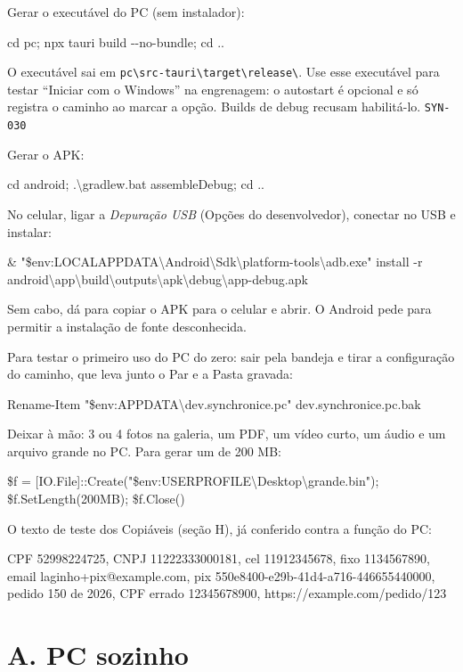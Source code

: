 \documentclass[11pt,a4paper]{article}
\newcommand{\letra}{P}
\newcommand{\secao}[2]{\renewcommand{\letra}{#1}\section*{#1. #2}\addcontentsline{toc}{section}{#1. #2}}
\newcommand{\fonte}[1]{\hfill{\small\color{fonte}\texttt{#1}}}
\newcommand{\cmd}[1]{\par\smallskip\colorbox{caixa}{\parbox{\dimexpr\linewidth-2\fboxsep}{\small\ttfamily #1}}\par\smallskip}
\begin{document}
\begin{passos}
  \item Gerar o executável do PC (sem instalador):
        \cmd{cd pc; npx tauri build -{}-no-bundle; cd ..}
        O executável sai em \texttt{pc\textbackslash src-tauri\textbackslash target\textbackslash release\textbackslash}.
        Use esse executável para testar ``Iniciar com o Windows'' na engrenagem:
        o autostart é opcional e só registra o caminho ao marcar a opção.
        Builds de debug recusam habilitá-lo. \fonte{SYN-030}
  \item Gerar o APK:
        \cmd{cd android; .\textbackslash gradlew.bat assembleDebug; cd ..}
  \item No celular, ligar a \emph{Depuração USB} (Opções do desenvolvedor),
        conectar no USB e instalar:
        \cmd{\& "\$env:LOCALAPPDATA\textbackslash Android\textbackslash Sdk\textbackslash platform-tools\textbackslash adb.exe" install -r android\textbackslash app\textbackslash build\textbackslash outputs\textbackslash apk\textbackslash debug\textbackslash app-debug.apk}
        Sem cabo, dá para copiar o APK para o celular e abrir. O Android pede
        para permitir a instalação de fonte desconhecida.
  \item Para testar o primeiro uso do PC do zero: sair pela bandeja e tirar a
        configuração do caminho, que leva junto o Par e a Pasta gravada:
        \cmd{Rename-Item "\$env:APPDATA\textbackslash dev.synchronice.pc" dev.synchronice.pc.bak}
  \item Deixar à mão: 3 ou 4 fotos na galeria, um PDF, um vídeo curto, um
        áudio e um arquivo grande no PC. Para gerar um de 200 MB:
        \cmd{\$f = [IO.File]::Create("\$env:USERPROFILE\textbackslash Desktop\textbackslash grande.bin"); \$f.SetLength(200MB); \$f.Close()}
  \item O texto de teste dos Copiáveis (seção H), já conferido contra a função
        do PC:
        \cmd{CPF 52998224725, CNPJ 11222333000181, cel 11912345678, fixo 1134567890, email laginho+pix@example.com, pix 550e8400-e29b-41d4-a716-446655440000, pedido 150 de 2026, CPF errado 12345678900, https://example.com/pedido/123}
\end{passos}

\secao{A}{PC sozinho}
\end{document}
